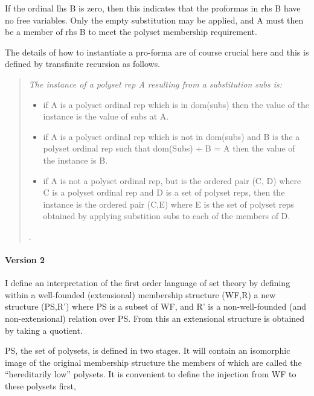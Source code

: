 \documentclass[numreferences]{rbjk}
\begin{document}
\begin{article}
If the ordinal \textsf{lhs B} is zero, then this indicates that the proformas in \textsf{rhs B} have no free variables.
Only the empty substitution may be applied, and \textsf{A} must then be a member of \textsf{rhs B} to meet the polyset membership requirement.

The details of how to instantiate a pro-forma are of course crucial here and this is defined by transfinite recursion as follows.

\begin{quote}
{\it
The instance of a polyset rep \textsf{A} resulting from a substitution \textsf{subs} is:
\begin{itemize}

\item if \textsf{A} is a polyset ordinal rep which is in \textsf{dom(subs)} then the value of the instance is the value of \textsf{subs} at \textsf{A}.

\item if \textsf{A} is a polyset ordinal rep which is not in \textsf{dom(subs)} and \textsf{B} is the a polyset ordinal rep such that \textsf{dom(Subs) + B = A} then the value of the instance is \textsf{B}.

\item if \textsf{A} is not a polyset ordinal rep, but is the ordered pair \textsf{(C, D)} where \textsf{C} is a polyset ordinal rep and \textsf{D} is a set of polyset reps, then the instance is the ordered pair \textsf{(C,E)} where E is the set of polyset reps obtained by applying substition \textsf{subs} to each of the members of \textsf{D}.
\end{itemize}.
}
\end{quote}

\paragraph{Version 2}

I define an interpretation of the first order language of set theory by defining within a well-founded (extensional) membership structure \textsf{(WF,R)} a new structure \textsf{(PS,R')} where \textsf{PS} is a subset of \textsf{WF}, and \textsf{R'} is a non-well-founded (and non-extensional) relation over \textsf{PS}. From this an extensional structure is obtained by taking a quotient.

\textsf{PS}, the set of polysets, is defined in two stages.
It will contain an isomorphic image of the original membership structure the members of which are called the ``hereditarily low'' polysets.
It is convenient to define the injection from \textsf{WF} to these polysets first,


\end{article}
\end{document}
